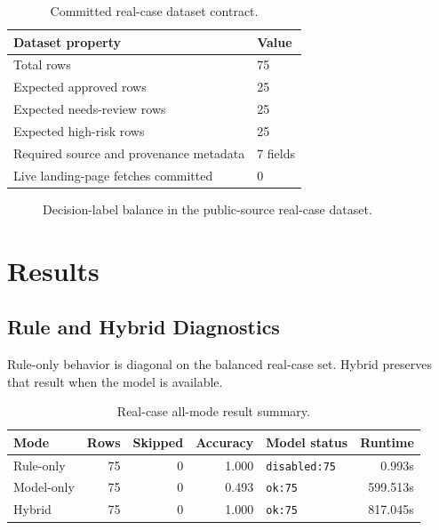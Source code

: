 \documentclass[10pt]{article}
\begin{document}
\begin{table}[!htbp]
\centering
\caption{Committed real-case dataset contract.}
\label{tab:real-case-contract}
\small
\begin{tabularx}{0.82\linewidth}{@{}L R{1.45cm}@{}}
\toprule
\textbf{Dataset property} & \textbf{Value} \\
\midrule
Total rows & 75 \\
Expected approved rows & 25 \\
Expected needs-review rows & 25 \\
Expected high-risk rows & 25 \\
Required source and provenance metadata & 7 fields \\
Live landing-page fetches committed & 0 \\
\bottomrule
\end{tabularx}
\end{table}

\begin{figure}[!htbp]
\centering
{}
\caption{Decision-label balance in the public-source real-case dataset.}
\label{fig:real-case-balance}
\end{figure}

\section{Results}

\subsection{Rule and Hybrid Diagnostics}

Rule-only behavior is diagonal on the balanced real-case set. Hybrid preserves
that result when the model is available.

\begin{table}[!htbp]
\centering
\caption{Real-case all-mode result summary.}
\label{tab:mode-summary}
\small
\begin{tabular}{@{}lrrrlr@{}}
\toprule
\textbf{Mode} & \textbf{Rows} & \textbf{Skipped} & \textbf{Accuracy} & \textbf{Model status} & \textbf{Runtime} \\
\midrule
Rule-only & 75 & 0 & 1.000 & \texttt{disabled:75} & 0.993s \\
Model-only & 75 & 0 & 0.493 & \texttt{ok:75} & 599.513s \\
Hybrid & 75 & 0 & 1.000 & \texttt{ok:75} & 817.045s \\
\bottomrule
\end{tabular}
\end{table}
\end{document}
